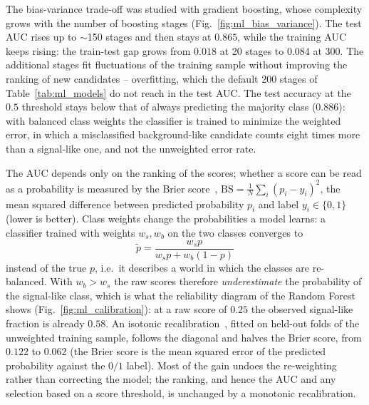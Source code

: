 The bias-variance trade-off was studied with gradient boosting, whose complexity grows with the number of boosting stages (Fig.~\ref{fig:ml_bias_variance}). The test AUC rises up to $\sim$150 stages and then stays at $0.865$, while the training AUC keeps rising: the train-test gap grows from $0.018$ at 20 stages to $0.084$ at 300. The additional stages fit fluctuations of the training sample without improving the ranking of new candidates -- overfitting, which the default 200 stages of Table~\ref{tab:ml_models} do not reach in the test AUC. The test accuracy at the $0.5$ threshold stays below that of always predicting the majority class ($0.886$): with balanced class weights the classifier is trained to minimize the weighted error, in which a misclassified background-like candidate counts eight times more than a signal-like one, and not the unweighted error rate.




The AUC depends only on the ranking of the scores; whether a score can be read as a probability is measured by the Brier score~\cite{brier}, $\mathrm{BS}=\frac{1}{N}\sum_i (p_i-y_i)^2$, the mean squared difference between predicted probability $p_i$ and label $y_i\in\{0,1\}$ (lower is better). Class weights change the probabilities a model learns: a classifier trained with weights $w_s,w_b$ on the two classes converges to
\[
\tilde p=\frac{w_s p}{w_s p+w_b(1-p)}
\]
instead of the true $p$, i.e.\ it describes a world in which the classes are re-balanced. With $w_b>w_s$ the raw scores therefore \emph{underestimate} the probability of the signal-like class, which is what the reliability diagram of the Random Forest shows (Fig.~\ref{fig:ml_calibration}): at a raw score of $0.25$ the observed signal-like fraction is already $0.58$. An isotonic recalibration~\cite{zadrozny_elkan}, fitted on held-out folds of the unweighted training sample, follows the diagonal and halves the Brier score, from $0.122$ to $0.062$ (the Brier score is the mean squared error of the predicted probability against the $0/1$ label). Most of the gain undoes the re-weighting rather than correcting the model; the ranking, and hence the AUC and any selection based on a score threshold, is unchanged by a monotonic recalibration.



